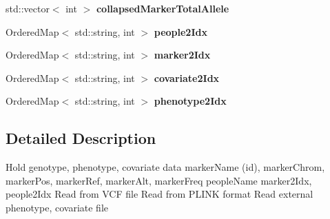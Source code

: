 \begin{DoxyCompactItemize}
\item 
\hypertarget{classVCFData_a525cb51f73a69999d6915caab6a0dd53}{std\-::vector$<$ int $>$ {\bfseries collapsed\-Marker\-Total\-Allele}}\label{classVCFData_a525cb51f73a69999d6915caab6a0dd53}

\item 
\hypertarget{classVCFData_ad1f61f7d437419416515290c7c473d94}{Ordered\-Map$<$ std\-::string, int $>$ {\bfseries people2\-Idx}}\label{classVCFData_ad1f61f7d437419416515290c7c473d94}

\item 
\hypertarget{classVCFData_ab8e7f7256fc5d6ae6b86e3b665e5a70a}{Ordered\-Map$<$ std\-::string, int $>$ {\bfseries marker2\-Idx}}\label{classVCFData_ab8e7f7256fc5d6ae6b86e3b665e5a70a}

\item 
\hypertarget{classVCFData_a4911ab48ac18b974d50dd80a5ee5acc3}{Ordered\-Map$<$ std\-::string, int $>$ {\bfseries covariate2\-Idx}}\label{classVCFData_a4911ab48ac18b974d50dd80a5ee5acc3}

\item 
\hypertarget{classVCFData_aef9b99ac39bb6a9fb4550a2665110e12}{Ordered\-Map$<$ std\-::string, int $>$ {\bfseries phenotype2\-Idx}}\label{classVCFData_aef9b99ac39bb6a9fb4550a2665110e12}

\end{DoxyCompactItemize}


\subsection{Detailed Description}
Hold genotype, phenotype, covariate data marker\-Name (id), marker\-Chrom, marker\-Pos, marker\-Ref, marker\-Alt, marker\-Freq people\-Name marker2\-Idx, people2\-Idx Read from V\-C\-F file Read from P\-L\-I\-N\-K format Read external phenotype, covariate file 

